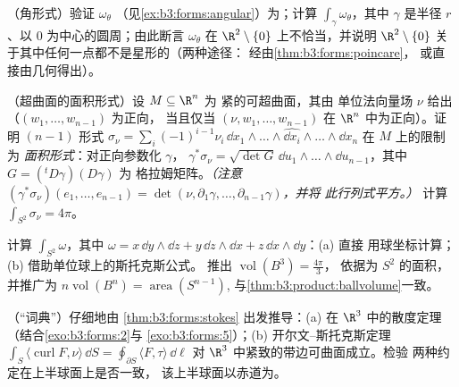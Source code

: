 \begin{exercise}[$\star\star$]\label{exo:b3:forms:4}
（角形式）验证 $\omega_\theta$
（见\cref{ex:b3:forms:angular}）为；计算
$\int_\gamma\omega_\theta$，其中 $\gamma$ 是半径
$r$、以 $0$ 为中心的圆周；由此断言 $\omega_\theta$ 在
$\R^2\setminus\{0\}$ 上不恰当，并说明 $\R^2\setminus\{0\}$
关于其中任何一点都不是星形的（两种途径：
经由\cref{thm:b3:forms:poincare}，
或直接由几何得出）。
\end{exercise}

\begin{exercise}[$\star\star$]\label{exo:b3:forms:5}
（超曲面的面积形式）设 $M \subseteq \R^n$ 为
紧的可超曲面，其由
单位法向量场 $\nu$ 给出（$(w_1, \dots, w_{n-1})$ 为正向，
当且仅当 $(\nu, w_1, \dots, w_{n-1})$ 在 $\R^n$ 中为正向）。证明
$(n-1)$ 形式 $\sigma_\nu =
\sum_i(-1)^{i-1}\nu_i\,\dd x_1\wedge\dots\wedge\widehat{\dd
x_i}\wedge\dots\wedge\dd x_n$ 在 $M$ 上的限制为
\emph{面积形式}：对正向参数化 $\gamma$，
$\gamma^*\sigma_\nu = \sqrt{\det G}\,\dd u_1\wedge\dots
\wedge\dd u_{n-1}$，其中 $G = ({}^t D\gamma)(D\gamma)$ 为
格拉姆矩阵。\emph{（注意
$(\gamma^*\sigma_\nu)(e_1, \dots, e_{n-1}) = \det(\nu,
\partial_1\gamma, \dots, \partial_{n-1}\gamma)$，并将
此行列式平方。）} 计算 $\int_{S^2}\sigma_\nu = 4\pi$。
\end{exercise}

\begin{exercise}[$\star\star$]\label{exo:b3:forms:6}
计算 $\int_{S^2}\omega$，其中 $\omega = x\,\dd y\wedge\dd z
+ y\,\dd z\wedge\dd x + z\,\dd x\wedge\dd y$：(a) 直接
用球坐标计算；(b) 借助单位球上的斯托克斯公式。
推出 $\operatorname{vol}(B^3) = \frac{4\pi}3$，
依据为 $S^2$ 的面积，并推广为
$n\operatorname{vol}(B^n) = \operatorname{area}(S^{n-1})$,
与\cref{thm:b3:product:ballvolume}一致。
\end{exercise}

\begin{exercise}[$\star\star$]\label{exo:b3:forms:7}
（“词典”）仔细地由
\cref{thm:b3:forms:stokes} 出发推导：(a) 在
$\R^3$ 中的散度定理（结合\cref{exo:b3:forms:2}与
\cref{exo:b3:forms:5}）；(b) 开尔文--斯托克斯定理
$\int_S\langle\operatorname{curl}F, \nu\rangle\,\dd S =
\oint_{\partial S}\langle F, \tau\rangle\,\dd\ell$ 对
$\R^3$ 中紧致的带边可曲面成立。检验
两种约定在上半球面上是否一致，
该上半球面以赤道为。
\end{exercise}

